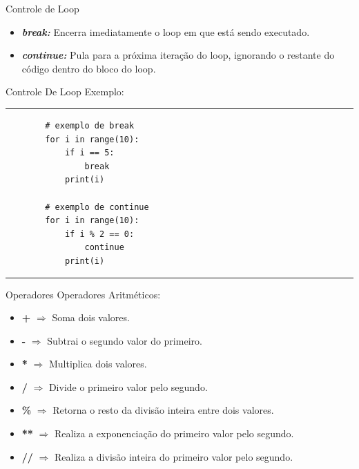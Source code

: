 \documentclass{beamer}
\begin{document}
\begin{frame}[fragile]{Controle de Loop}
	\label{controle_de_loop}
	\begin{itemize}
		\item  \textbf{\textit{break:}} Encerra imediatamente o loop em que está sendo executado.
		\item \textbf{\textit{continue:}} Pula para a próxima iteração do loop, ignorando o restante do código dentro do bloco do loop.
	\end{itemize}
\end{frame}

\begin{frame}[fragile]{Controle De Loop}
	\label{controle_de_loop_exemplo}
	Exemplo:
	\rule{\textwidth}{1pt}
	\scriptsize
	\begin{verbatim}
		# exemplo de break
		for i in range(10):
			if i == 5:
				break
			print(i)
		
		# exemplo de continue
		for i in range(10):
			if i % 2 == 0:
				continue
			print(i)

	\end{verbatim}
	\rule{\textwidth}{1pt}
	
\end{frame}


\begin{frame}[fragile]{Operadores}
	\label{operadores_aritmeticos}
	Operadores Aritméticos:
	
	\begin{itemize}
		\item \textbf{+} $\Rightarrow$ Soma dois valores.
		\item \textbf{-} $\Rightarrow$ Subtrai o segundo valor do primeiro.
		\item \textbf{*} $\Rightarrow$ Multiplica dois valores.
		\item \textbf{/} $\Rightarrow$ Divide o primeiro valor pelo segundo.
		\item \textbf{\%} $\Rightarrow$ Retorna o resto da divisão inteira entre dois valores.
		\item \textbf{**} $\Rightarrow$ Realiza a exponenciação do primeiro valor pelo segundo.
		\item \textbf{//} $\Rightarrow$ Realiza a divisão inteira do primeiro valor pelo segundo.
	\end{itemize}

\end{frame}
\end{document}
